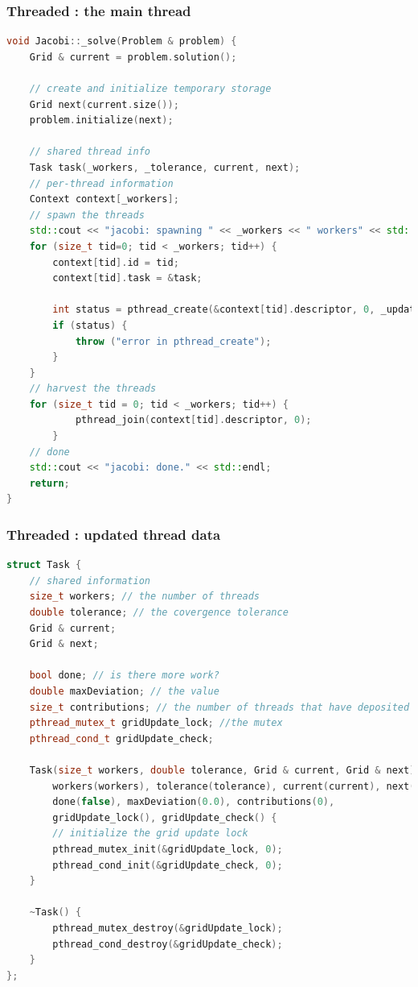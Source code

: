 \begin{frame}[fragile]
% 
  \frametitle{Threaded : the main thread}
%
  \begin{lstlisting}[language=c++,name=Jacobi:updated-solve,basicstyle=\tt\bfseries\tiny]
void Jacobi::_solve(Problem & problem) {
    Grid & current = problem.solution();

    // create and initialize temporary storage
    Grid next(current.size());
    problem.initialize(next);

    // shared thread info
    Task task(_workers, _tolerance, current, next);
    // per-thread information
    Context context[_workers];
    // spawn the threads
    std::cout << "jacobi: spawning " << _workers << " workers" << std::endl;
    for (size_t tid=0; tid < _workers; tid++) {
        context[tid].id = tid;
        context[tid].task = &task;
        
        int status = pthread_create(&context[tid].descriptor, 0, _update, &context[tid]);
        if (status) {
            throw ("error in pthread_create");
        }
    }
    // harvest the threads
    for (size_t tid = 0; tid < _workers; tid++) {
            pthread_join(context[tid].descriptor, 0);
        }
    // done
    std::cout << "jacobi: done." << std::endl;
    return;
}
  \end{lstlisting}
%
\end{frame}

\begin{frame}[fragile]
% 
  \frametitle{Threaded : updated thread data}
%
  \begin{lstlisting}[language=c++,name=Jacobi:updated-threaded,basicstyle=\tt\bfseries\tiny]
struct Task {
    // shared information 
    size_t workers; // the number of threads
    double tolerance; // the covergence tolerance
    Grid & current;
    Grid & next;

    bool done; // is there more work?
    double maxDeviation; // the value
    size_t contributions; // the number of threads that have deposited contributions
    pthread_mutex_t gridUpdate_lock; //the mutex
    pthread_cond_t gridUpdate_check;

    Task(size_t workers, double tolerance, Grid & current, Grid & next) :
        workers(workers), tolerance(tolerance), current(current), next(next),
        done(false), maxDeviation(0.0), contributions(0),
        gridUpdate_lock(), gridUpdate_check() {
        // initialize the grid update lock
        pthread_mutex_init(&gridUpdate_lock, 0);
        pthread_cond_init(&gridUpdate_check, 0);
    }

    ~Task() {
        pthread_mutex_destroy(&gridUpdate_lock);
        pthread_cond_destroy(&gridUpdate_check);
    }
};

  \end{lstlisting}
%
\end{frame}

